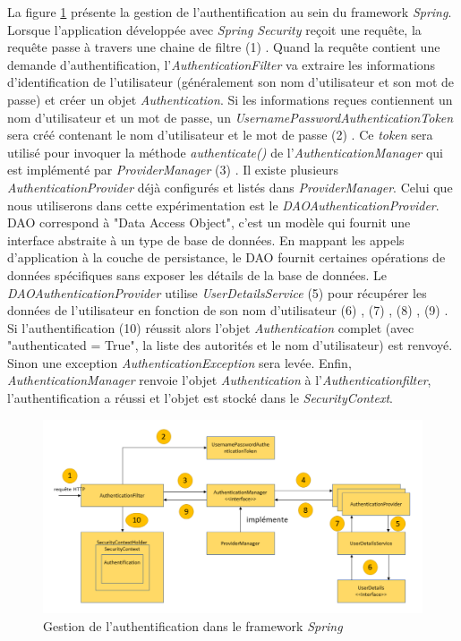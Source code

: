 La figure \ref{fig:ArchitectureAuthentificationSpring} présente la gestion de l'authentification au sein du framework \textit{Spring}. Lorsque l’application développée avec \textit{Spring Security} reçoit une requête, la requête passe à travers une chaine de filtre (1) . Quand la requête contient une demande d’authentification, l’\textit{AuthenticationFilter} va extraire les informations d’identification de l’utilisateur (généralement son nom d’utilisateur et son mot de passe) et créer un objet \textit{Authentication}. Si les informations reçues contiennent un nom d’utilisateur et un mot de passe, un \textit{UsernamePasswordAuthenticationToken} sera créé contenant le nom d’utilisateur et le mot de passe (2) . Ce \textit{token} sera utilisé pour invoquer la méthode \textit{authenticate()} de l’\textit{AuthenticationManager} qui est implémenté par \textit{ProviderManager} (3) . Il existe plusieurs \textit{AuthenticationProvider} déjà configurés et listés dans \textit{ProviderManager}. Celui que nous utiliserons dans
cette expérimentation est le \textit{DAOAuthenticationProvider}. DAO correspond à "Data Access Object", c’est un modèle qui fournit une interface abstraite à un type de base de données. En mappant les appels d’application à la couche de persistance, le DAO fournit certaines opérations de données spécifiques sans exposer les détails de la base de données. Le \textit{DAOAuthenticationProvider} utilise \textit{UserDetailsService} (5) pour récupérer les données de l’utilisateur en fonction de son nom d’utilisateur (6) , (7) , (8) , (9) . Si l’authentification (10) réussit alors l’objet \textit{Authentication} complet (avec "authenticated = True", la liste des autorités et le nom d’utilisateur) est renvoyé. Sinon une exception \textit{AuthenticationException} sera levée. Enfin, \textit{AuthenticationManager} renvoie l’objet \textit{Authentication} à l’\textit{Authenticationfilter}, l’authentification a réussi et l’objet est stocké dans le \textit{SecurityContext}.

\begin{figure}[!h]
    \centering
    \includegraphics[width=1.0 \columnwidth]{figures/ArchitectureAuthentificationSpring.png}
    \caption{Gestion de l'authentification dans le framework \textit{Spring}}
    \label{fig:ArchitectureAuthentificationSpring}
\end{figure}

